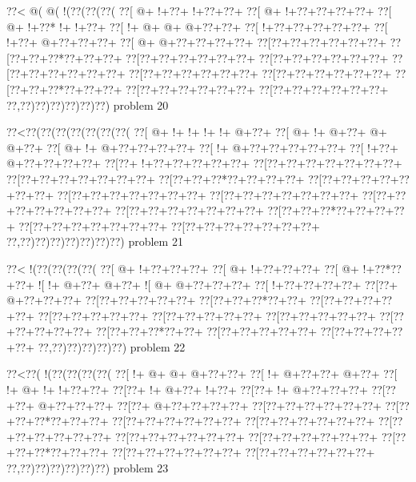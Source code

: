 \vbox{\vbox{\goo
\0??<\- @(\- @(\- !(\0??(\0??(\0??(
\0??[\- @+\- !+\0??+\- !+\0??+\0??+
\0??[\- @+\- !+\0??+\0??+\0??+\0??+
\0??[\- @+\- !+\0??*\- !+\- !+\0??+
\0??[\- !+\- @+\- @+\- @+\0??+\0??+
\0??[\- !+\0??+\0??+\0??+\0??+\0??+
\0??[\- !+\0??+\- @+\0??+\0??+\0??+
\0??[\- @+\- @+\0??+\0??+\0??+\0??+
\0??[\0??+\0??+\0??+\0??+\0??+\0??+
\0??[\0??+\0??+\0??*\0??+\0??+\0??+
\0??[\0??+\0??+\0??+\0??+\0??+\0??+
\0??[\0??+\0??+\0??+\0??+\0??+\0??+
\0??[\0??+\0??+\0??+\0??+\0??+\0??+
\0??[\0??+\0??+\0??+\0??+\0??+\0??+
\0??[\0??+\0??+\0??+\0??+\0??+\0??+
\0??[\0??+\0??+\0??*\0??+\0??+\0??+
\0??[\0??+\0??+\0??+\0??+\0??+\0??+
\0??[\0??+\0??+\0??+\0??+\0??+\0??+
\0??,\0??)\0??)\0??)\0??)\0??)\0??)
}
\hfil problem 20\hfil\break
}

\vbox{\vbox{\goo
\0??<\0??(\0??(\0??(\0??(\0??(\0??(\0??(
\0??[\- @+\- !+\- !+\- !+\- !+\- @+\0??+
\0??[\- @+\- !+\- @+\0??+\- @+\- @+\0??+
\0??[\- @+\- !+\- @+\0??+\0??+\0??+\0??+
\0??[\- !+\- @+\0??+\0??+\0??+\0??+\0??+
\0??[\- !+\0??+\- @+\0??+\0??+\0??+\0??+
\0??[\0??+\- !+\0??+\0??+\0??+\0??+\0??+
\0??[\0??+\0??+\0??+\0??+\0??+\0??+\0??+
\0??[\0??+\0??+\0??+\0??+\0??+\0??+\0??+
\0??[\0??+\0??+\0??*\0??+\0??+\0??+\0??+
\0??[\0??+\0??+\0??+\0??+\0??+\0??+\0??+
\0??[\0??+\0??+\0??+\0??+\0??+\0??+\0??+
\0??[\0??+\0??+\0??+\0??+\0??+\0??+\0??+
\0??[\0??+\0??+\0??+\0??+\0??+\0??+\0??+
\0??[\0??+\0??+\0??+\0??+\0??+\0??+\0??+
\0??[\0??+\0??+\0??*\0??+\0??+\0??+\0??+
\0??[\0??+\0??+\0??+\0??+\0??+\0??+\0??+
\0??[\0??+\0??+\0??+\0??+\0??+\0??+\0??+
\0??,\0??)\0??)\0??)\0??)\0??)\0??)\0??)
}
\hfil problem 21\hfil\break
}

\vbox{\vbox{\goo
\0??<\- !(\0??(\0??(\0??(\0??(
\0??[\- @+\- !+\0??+\0??+\0??+
\0??[\- @+\- !+\0??+\0??+\0??+
\0??[\- @+\- !+\0??*\0??+\0??+
\- ![\- !+\- @+\0??+\- @+\0??+
\- ![\- @+\- @+\0??+\0??+\0??+
\0??[\- !+\0??+\0??+\0??+\0??+
\0??[\0??+\- @+\0??+\0??+\0??+
\0??[\0??+\0??+\0??+\0??+\0??+
\0??[\0??+\0??+\0??*\0??+\0??+
\0??[\0??+\0??+\0??+\0??+\0??+
\0??[\0??+\0??+\0??+\0??+\0??+
\0??[\0??+\0??+\0??+\0??+\0??+
\0??[\0??+\0??+\0??+\0??+\0??+
\0??[\0??+\0??+\0??+\0??+\0??+
\0??[\0??+\0??+\0??*\0??+\0??+
\0??[\0??+\0??+\0??+\0??+\0??+
\0??[\0??+\0??+\0??+\0??+\0??+
\0??,\0??)\0??)\0??)\0??)\0??)
}
\hfil problem 22\hfil\break
}

\vbox{\vbox{\goo
\0??<\0??(\- !(\0??(\0??(\0??(\0??(
\0??[\- !+\- @+\- @+\- @+\0??+\0??+
\0??[\- !+\- @+\0??+\0??+\- @+\0??+
\0??[\- !+\- @+\- !+\- !+\0??+\0??+
\0??[\0??+\- !+\- @+\0??+\- !+\0??+
\0??[\0??+\- !+\- @+\0??+\0??+\0??+
\0??[\0??+\0??+\- @+\0??+\0??+\0??+
\0??[\0??+\- @+\0??+\0??+\0??+\0??+
\0??[\0??+\0??+\0??+\0??+\0??+\0??+
\0??[\0??+\0??+\0??*\0??+\0??+\0??+
\0??[\0??+\0??+\0??+\0??+\0??+\0??+
\0??[\0??+\0??+\0??+\0??+\0??+\0??+
\0??[\0??+\0??+\0??+\0??+\0??+\0??+
\0??[\0??+\0??+\0??+\0??+\0??+\0??+
\0??[\0??+\0??+\0??+\0??+\0??+\0??+
\0??[\0??+\0??+\0??*\0??+\0??+\0??+
\0??[\0??+\0??+\0??+\0??+\0??+\0??+
\0??[\0??+\0??+\0??+\0??+\0??+\0??+
\0??,\0??)\0??)\0??)\0??)\0??)\0??)
}
\hfil problem 23\hfil\break
}

